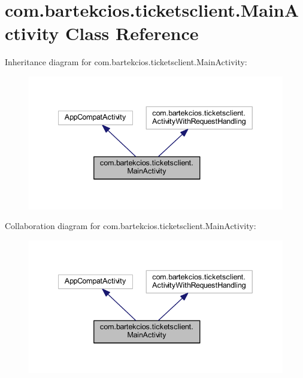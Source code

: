 \hypertarget{classcom_1_1bartekcios_1_1ticketsclient_1_1_main_activity}{}\section{com.\+bartekcios.\+ticketsclient.\+Main\+Activity Class Reference}
\label{classcom_1_1bartekcios_1_1ticketsclient_1_1_main_activity}


Inheritance diagram for com.\+bartekcios.\+ticketsclient.\+Main\+Activity\+:
\nopagebreak
\begin{figure}[H]
\begin{center}
\leavevmode
\includegraphics[width=340pt]{classcom_1_1bartekcios_1_1ticketsclient_1_1_main_activity__inherit__graph}
\end{center}
\end{figure}


Collaboration diagram for com.\+bartekcios.\+ticketsclient.\+Main\+Activity\+:
\nopagebreak
\begin{figure}[H]
\begin{center}
\leavevmode
\includegraphics[width=340pt]{classcom_1_1bartekcios_1_1ticketsclient_1_1_main_activity__coll__graph}
\end{center}
\end{figure}
